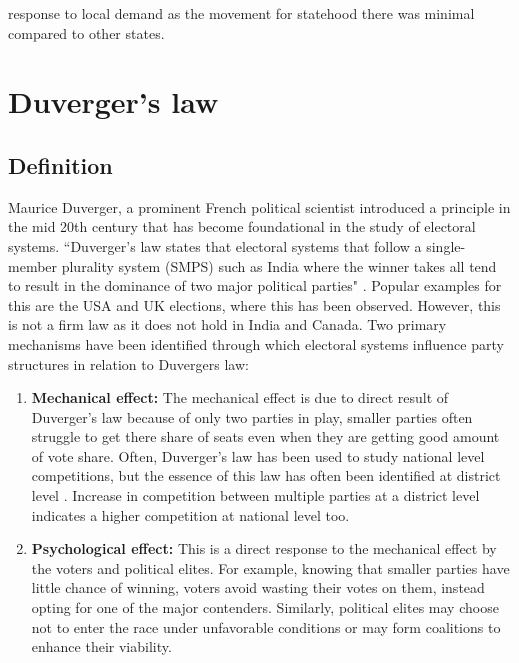 \begin{sloppypar}
response to local demand as the movement for statehood there was minimal compared to other states.

\section{Duverger's law}
\subsection{Definition}
Maurice Duverger, a prominent French political scientist introduced a principle in the mid 20th century that has  become foundational in the study of electoral systems. ``Duverger's law states that electoral systems that follow a single-member plurality system (SMPS) such as India where the winner takes all tend to result in the dominance of two major political parties" \citep{duverger1954political}. Popular examples for this are the USA and UK elections, where this has been observed. However, this is not a firm law as it does not hold in India and Canada.
Two primary mechanisms have been identified through which electoral systems influence party structures in relation to Duvergers law:
 \begin{enumerate}
     \item \textbf{Mechanical effect:}  The mechanical effect is due to direct result of Duverger's law  because of only two parties in play, smaller parties often struggle to get there share of seats even when they are getting good amount of vote share. Often, Duverger's law has been used to study national level competitions, but the essence of this law has often been identified at district level \citep{cox1997making,GALLAGHER199133,lijphart1994,rae1971political}. Increase in competition between multiple parties at a district level indicates a higher competition at national level too.
     \item \textbf{Psychological effect:} This is a direct response to the mechanical effect by the voters and political elites. For example, knowing that smaller parties have little chance of winning, voters avoid wasting their votes on them, instead opting for one of the major contenders. Similarly, political elites may choose not to enter the race under unfavorable conditions or may form coalitions to enhance their viability.
 \end{enumerate}

\end{sloppypar}
